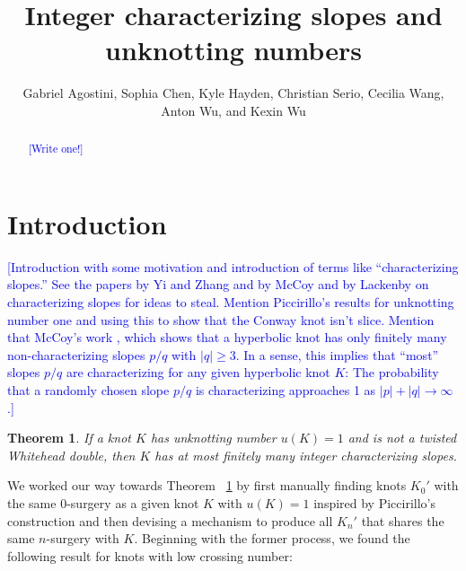 \documentclass[11pt,usenames,dvipsnames,reqno]{amsart}
\newtheorem{theorem}{Theorem}
\numberwithin{theorem}{section}
\theoremstyle{ex}
\theoremstyle{rem}
\def\kh#1{\textcolor{Blue}{#1}}
\begin{document}


\title{Integer characterizing slopes and unknotting numbers}

\author[G. Agostini, S. Chen, K. Hayden, C. Serio, C. Wang, A. Wu, and K. Wu]{Gabriel Agostini, Sophia Chen, Kyle Hayden, Christian Serio, Cecilia Wang, Anton Wu, and Kexin Wu}



\begin{abstract} 
\kh{[Write one!]}
\end{abstract}


\maketitle

\section{Introduction}\label{sec:intro}

\kh{[Introduction with some motivation and introduction of terms like ``characterizing slopes.'' See the papers by Yi and Zhang and by McCoy and by Lackenby on characterizing slopes for ideas to steal. Mention Piccirillo's results for unknotting number one and using this to show that the Conway knot isn't slice. Mention that McCoy's work \cite{mccoy:hyperbolic}, which shows that a hyperbolic knot has only finitely many non-characterizing slopes $p/q$ with $|q| \geq 3$. In a sense, this implies that ``most'' slopes $p/q$ are characterizing for any given hyperbolic knot $K$: The  probability that a randomly chosen slope $p/q$ is characterizing approaches 1 as $|p|+|q|\to \infty$.]}

\begin{theorem}\label{thm:unknotting-one} If a knot $K$ has unknotting number $u(K)=1$ and is not a twisted Whitehead double, then $K$ has at most finitely many integer characterizing slopes.
\end{theorem}

We worked our way towards Theorem ~\ref{thm:unknotting-one} by first manually finding knots $K_{0}'$ with the same $0$-surgery as a given knot $K$ with $u(K)=1$ inspired by Piccirillo's construction and then devising a mechanism to produce all $K_n'$ that shares the same $n$-surgery with $K$. Beginning with the former process, we found the following result for knots with low crossing number:
\end{document}

